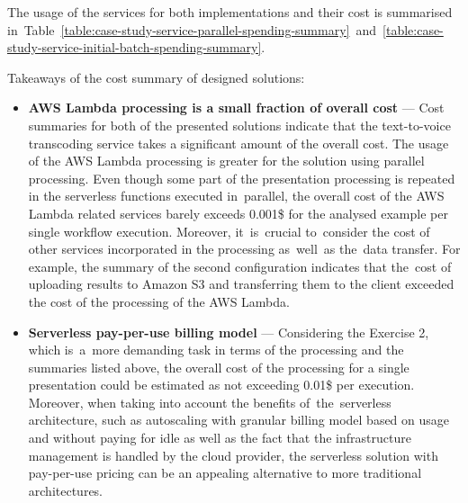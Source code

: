 The usage of the services for both implementations and their cost is summarised in~Table~\ref{table:case-study-service-parallel-spending-summary}~and~\ref{table:case-study-service-initial-batch-spending-summary}. 

Takeaways of the cost summary of designed solutions:

\begin{itemize}
   \item \textbf{AWS Lambda processing is a small fraction of overall cost} --- Cost summaries for both of the presented solutions indicate that the text-to-voice transcoding service takes a significant amount of the overall cost.
   The usage of the AWS Lambda processing is greater for the solution using parallel processing.
   Even though some part of the presentation processing is repeated in the serverless functions executed in~parallel, the overall cost of the AWS Lambda related services barely exceeds 0.001\$ for the analysed example per single workflow execution.
   Moreover, it~is~crucial to~consider the cost of other services incorporated in the processing as~well~as the~data transfer.
   For example, the summary of the second configuration indicates that the~cost of uploading results to Amazon S3 and transferring them to the client exceeded the cost of the processing of the AWS Lambda.
   \item \textbf{Serverless pay-per-use billing model} --- Considering the Exercise 2, which is~a~more demanding task in terms of the processing and the summaries listed above, the overall cost of the processing for a single presentation could be estimated as not exceeding 0.01\$ per execution.
   Moreover, when taking into account the benefits of~the~serverless architecture, such as autoscaling with granular billing model based on usage and without paying for idle as well as the fact that the infrastructure management is handled by the cloud provider, the serverless solution with pay-per-use pricing can be an appealing alternative to more traditional architectures.
\end{itemize}


